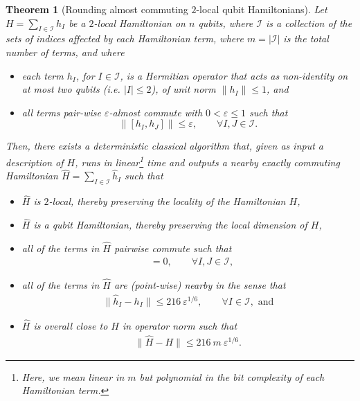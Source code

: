 \documentclass[11pt]{article}
\theoremstyle{plain}
\newtheorem{theorem}{Theorem}[section]
\newcommand{\eps}{\varepsilon}
\begin{document}
\begin{theorem}[Rounding almost commuting $2$-local qubit Hamiltonians]\label{thm:transforming-hamiltonian}
Let $H = \sum\limits_{I \in \mathcal{I}} h_{I}$ be a $2$-local 
Hamiltonian on $n$ qubits, where $\mathcal{I}$ is a collection of the sets of indices affected by each Hamiltonian term, where $m = |\mathcal{I}|$ is the total number of terms, and where
\begin{itemize}
    \item each term $h_{I}$, for $I \in \mathcal{I}$, is a Hermitian operator that acts as non-identity on at most two qubits (i.e. $|I| \leq 2$), of unit norm $\| h_I \| \leq 1$, and
    \item all terms pair-wise $\eps$-almost commute with $0 < \eps \leq 1$ such that
\[ \| [h_{I}, h_{J} ] \| \leq \eps, \quad\quad \forall I, J \in \mathcal{I}. \]
\end{itemize}
Then, there exists a deterministic classical algorithm that, given as input a description of $H$, runs 
in linear\footnote{Here, we mean linear in $m$ but polynomial in the bit complexity of each Hamiltonian term.} time  and outputs a nearby exactly commuting Hamiltonian $\hat{H} = \sum\limits_{I \in \mathcal{I}} \hat{h}_{I}$ such that 
\begin{itemize}
\item $\hat{H}$ is $2$-local, thereby preserving the locality of the Hamiltonian $H$,
\item $\hat{H}$ is a qubit Hamiltonian, thereby preserving the local dimension of $H$,
\item all of the terms in $\hat{H}$ pairwise commute such that
    \begin{align} 
[\hat{h}_{I}, \hat{h}_{J}] &= 0, \quad\quad \forall I, J \in \mathcal{I}, \label{eq:exact-commutation}
\end{align}
\item all of the terms in $\hat{H}$ are (point-wise) nearby in the sense that 
\begin{align}
\| \hat{h}_{I} - h_{I} \| \leq 216\ \eps^{1/6}, \quad\quad \forall I \in \mathcal{I}, \text{ and}\label{eq:overall-rounding-term-error}
\end{align}
\item $\hat{H}$ is overall close to $H$ in operator norm such that
\begin{align}
\|\hat{H} - H\| \leq 216\ m \ \eps^{1/6}.\label{eq:rounding-error}
\end{align}
\end{itemize}
\end{theorem}
\end{document}

